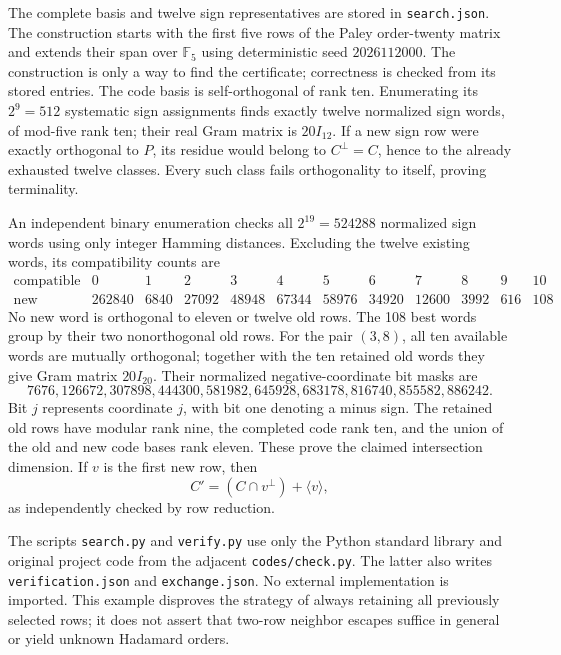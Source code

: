 \documentclass[11pt]{article}
\begin{document}
The complete basis and twelve sign representatives are stored in
\texttt{search.json}. The construction starts with the first five rows
of the Paley order-twenty matrix and extends their span over
$\mathbb F_5$ using deterministic seed $2026112000$.
The construction is only a way to find the certificate; correctness
is checked from its stored entries. The code basis is self-orthogonal
of rank ten. Enumerating its $2^9=512$ systematic sign assignments
finds exactly twelve normalized sign words, of mod-five rank ten;
their real Gram matrix is $20I_{12}$.
If a new sign row were exactly orthogonal to $P$, its residue would
belong to $C^\perp=C$, hence to the already exhausted twelve classes.
Every such class fails orthogonality to itself, proving terminality.

An independent binary enumeration checks all $2^{19}=524288$
normalized sign words using only integer Hamming distances. Excluding
the twelve existing words, its compatibility counts are
\[
\begin{array}{c|rrrrrrrrrrr}
\text{compatible}&0&1&2&3&4&5&6&7&8&9&10\\\hline
\text{new classes}&262840&6840&27092&48948&67344&58976&34920&12600&3992&616&108
\end{array}
\]
No new word is orthogonal to eleven or twelve old rows. The 108
best words group by their two nonorthogonal old rows. For the pair
$(3,8)$, all ten available words are mutually orthogonal; together
with the ten retained old words they give Gram matrix $20I_{20}$.
Their normalized negative-coordinate bit masks are
\[
7676,126672,307898,444300,581982,645928,683178,816740,855582,886242.
\]
Bit $j$ represents coordinate $j$, with bit one denoting a minus sign.
The retained old rows have modular rank nine, the completed code
rank ten, and the union of the old and new code bases rank eleven.
These prove the claimed intersection dimension. If $v$ is the first
new row, then
\[
 C'=(C\cap v^\perp)+\langle v\rangle,
\]
as independently checked by row reduction.

The scripts \texttt{search.py} and \texttt{verify.py} use only the
Python standard library and original project code from the adjacent
\texttt{codes/check.py}. The latter also writes
\texttt{verification.json} and \texttt{exchange.json}. No external
implementation is imported. This example disproves the strategy of
always retaining all previously selected rows; it does not assert
that two-row neighbor escapes suffice in general or yield unknown
Hadamard orders.
\end{document}

